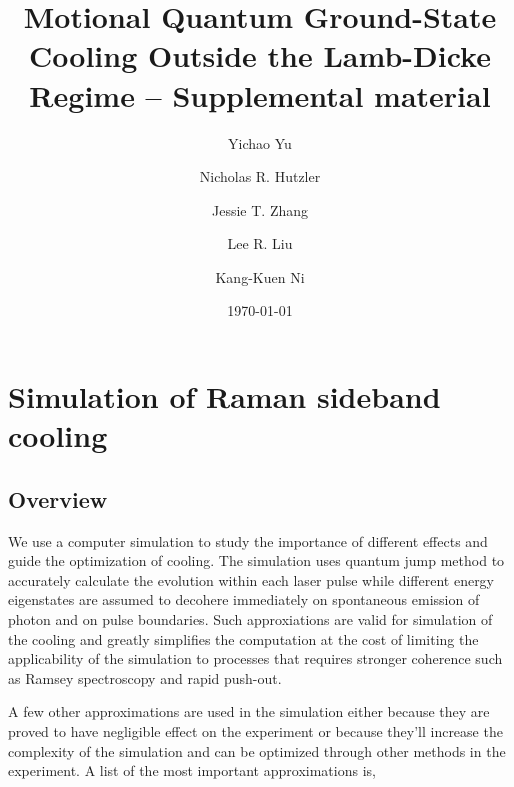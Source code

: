 \documentclass[aps,twocolumn,secnumarabic,balancelastpage,amsmath,amssymb]{revtex4}
\begin{document}
\title{Motional Quantum Ground-State Cooling Outside the Lamb-Dicke Regime -- Supplemental material}
\author{Yichao Yu}
\author{Nicholas R. Hutzler}
\author{Jessie T. Zhang}
\author{Lee R. Liu}
\author{Kang-Kuen Ni}

\date{\today}

\maketitle

\section{Simulation of Raman sideband cooling}

\subsection{Overview}

We use a computer simulation to study the importance of different effects
and guide the optimization of cooling. The simulation uses quantum jump method to accurately
calculate the evolution within each laser pulse while different energy eigenstates are assumed
to decohere immediately on spontaneous emission of photon and on pulse boundaries.
Such approxiations are valid for simulation of the cooling and greatly simplifies the computation
at the cost of limiting the applicability of the simulation to processes that requires stronger
coherence such as Ramsey spectroscopy and rapid push-out.

A few other approximations are used in the simulation either because they are proved to have
negligible effect on the experiment or because they'll increase the complexity of the simulation
and can be optimized through other methods in the experiment.
A list of the most important approximations is,
\end{document}
